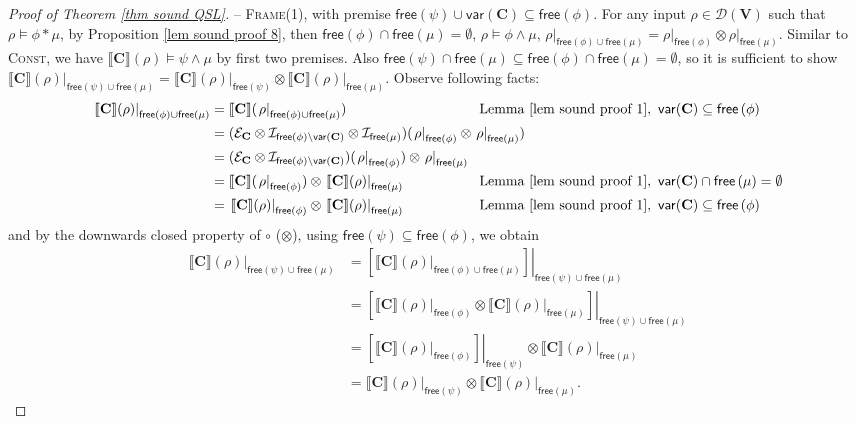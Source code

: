 \documentclass[conference,compsoc, 10pt]{IEEEtran}
\newcommand {\cD } {{\mathcal{D}}}
\newcommand {\cE } {{\mathcal{E}}}
\newcommand {\cI } {{\mathcal{I}}}
\newcommand {\free }[1] {{\mathsf{free}\left(#1\right)}}
\newcommand {\rt }[2] {{\left.{#1}\right|_{#2}}}
\newcommand {\vars } {\mathbf{V}}
\newcommand {\var } {\mathsf{var}}
\newcommand {\prog } {{\mathbf{C}}}
\newcommand {\sem}[1] {\llbracket#1\rrbracket}
\begin{document}
\begin{appendices}
\begin{proof}[Proof of Theorem \ref{thm sound QSL}]
			\noindent -- \textsc{Frame}(1), with premise $\free{\psi}\cup\var(\prog)\subseteq\free{\phi}$. For any input $\rho\in\cD(\vars)$ such that $\rho\models\phi\ast\mu$, by Proposition \ref{lem sound proof 8}, then $\free{\phi}\cap\free{\mu}=\emptyset$, $\rho\models\phi\wedge\mu$, $\rt{\rho}{\free{\phi}\cup\free{\mu}} = \rt{\rho}{\free{\phi}} \otimes \rt{\rho}{\free{\mu}}$. Similar to \textsc{Const}, we have $\sem{\prog}(\rho)\models\psi\wedge\mu$ by first two premises. Also $\free{\psi}\cap\free{\mu}\subseteq\free{\phi}\cap\free{\mu} = \emptyset$, so it is sufficient to show $\rt{\sem{\prog}(\rho)}{\free{\psi}\cup\free{\mu}} = \rt{\sem{\prog}(\rho)}{\free{\psi}} \otimes \rt{\sem{\prog}(\rho)}{\free{\mu}}$. Observe following facts:
			\begin{align*}
			\rt{\sem{\prog}(\rho)}{\free{\phi}\cup\free{\mu}} &= \sem{\prog}(\rt{\rho}{\free{\phi}\cup\free{\mu}}) &&\hspace{-1.5cm} \text{Lemma\ \ref{lem sound proof 1}},\ \var(\prog)\subseteq\free{\phi} \\
			&= (\cE_\prog\otimes\cI_{\free{\phi}\backslash\var(\prog)}\otimes\cI_{\free{\mu}})(\rt{\rho}{\free{\phi}} \otimes \rt{\rho}{\free{\mu}}) && \\
			&= (\cE_\prog\otimes\cI_{\free{\phi}\backslash\var(\prog)})(\rt{\rho}{\free{\phi}})\otimes\rt{\rho}{\free{\mu}} &&\\
			&= \sem{\prog}(\rt{\rho}{\free{\phi}})\otimes\rt{\sem{\prog}(\rho)}{\free{\mu}} && \hspace{-1.5cm} \text{Lemma\ \ref{lem sound proof 1}},\ \var(\prog)\cap\free{\mu}=\emptyset\\
			&= \rt{\sem{\prog}(\rho)}{\free{\phi}}\otimes\rt{\sem{\prog}(\rho)}{\free{\mu}} && \hspace{-1.5cm} \text{Lemma\ \ref{lem sound proof 1}},\ \var(\prog)\subseteq\free{\phi}
			\end{align*}
			and by the downwards closed property of $\circ$ ($\otimes$), using $\free{\psi}\subseteq\free{\phi}$, we obtain
			\begin{align*}
			\rt{\sem{\prog}(\rho)}{\free{\psi}\cup\free{\mu}} &= \rt{\left[\rt{\sem{\prog}(\rho)}{\free{\phi}\cup\free{\mu}}\right]}{\free{\psi}\cup\free{\mu}} \\
			&= \rt{\left[\rt{\sem{\prog}(\rho)}{\free{\phi}}\otimes\rt{\sem{\prog}(\rho)}{\free{\mu}}\right]}{\free{\psi}\cup\free{\mu}} \\
			&= \rt{\left[\rt{\sem{\prog}(\rho)}{\free{\phi}}\right]}{\free{\psi}}\otimes\rt{\sem{\prog}(\rho)}{\free{\mu}} \\
			&= \rt{\sem{\prog}(\rho)}{\free{\psi}}\otimes\rt{\sem{\prog}(\rho)}{\free{\mu}}.
			\end{align*}
			

\end{proof}
\end{appendices}
\end{document}
